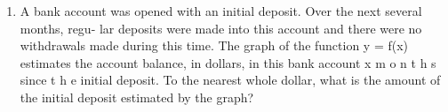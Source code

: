 \documentclass[12pt]{exam}
\begin{document}
\begin{enumerate}
\begin{center}
\begin{tikzpicture}[scale=0.4]
\end{tikzpicture}
\end{center}
    \item A bank account was opened with an initial
deposit. Over the next several months, regu-
lar deposits were made into this account and
there were no withdrawals made during this
time. The graph of the function y = f(x)
estimates the account balance, in dollars, in
this bank account x m o n t h s since t h e initial
deposit. To the nearest whole dollar, what is
the amount of the initial deposit estimated
by the graph?
\begin{center}
\end{center}
\end{enumerate}
\end{document}

